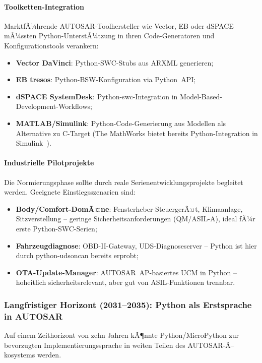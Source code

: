 ﻿\documentclass[12pt,a4paper,twoside]{article}
\begin{document}
\paragraph{Toolketten-Integration}
MarktfÃ¼hrende AUTOSAR-Toolhersteller wie Vector, EB oder dSPACE mÃ¼ssten
Python-UnterstÃ¼tzung in ihren Code-Generatoren und Konfigurationstools verankern:
\begin{itemize}
  \item \textbf{Vector DaVinci}: Python-SWC-Stubs aus ARXML generieren;
  \item \textbf{EB tresos}: Python-BSW-Konfiguration via Python~API;
  \item \textbf{dSPACE SystemDesk}: Python-\gls{swc}-Integration in
        Model-Based-Development-Workflows;
  \item \textbf{MATLAB/Simulink}: Python-Code-Generierung aus Modellen
        als Alternative zu C-Target (The MathWorks bietet bereits
        Python-Integration in Simulink~\cite{ml_python_survey2023}).
\end{itemize}

\paragraph{Industrielle Pilotprojekte}
Die Normierungsphase sollte durch reale Serienentwicklungsprojekte
begleitet werden. Geeignete Einstiegsszenarien sind:
\begin{itemize}
  \item \textbf{Body/Comfort-DomÃ¤ne}: Fensterheber-SteuergerÃ¤t, Klimaanlage,
        Sitzverstellung -- geringe Sicherheitsanforderungen (QM/ASIL-A),
        ideal fÃ¼r erste Python-SWC-Serien;
  \item \textbf{Fahrzeugdiagnose}: OBD-II-Gateway, UDS-Diagnoseserver --
        Python ist hier durch python-udsoncan bereits erprobt;
  \item \textbf{OTA-Update-Manager}: AUTOSAR~AP-basiertes UCM in Python --
        hoheitlich sicherheitsrelevant, aber gut von ASIL-Funktionen
        trennbar.
\end{itemize}

\subsubsection{Langfristiger Horizont (2031--2035): Python als
  Erstsprache in AUTOSAR}

Auf einem Zeithorizont von zehn Jahren kÃ¶nnte Python/MicroPython
zur bevorzugten Implementierungssprache in weiten Teilen des
AUTOSAR-Ã–kosystems werden.
\end{document}
